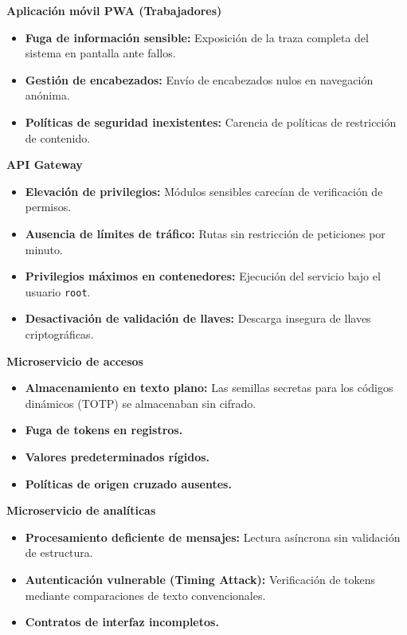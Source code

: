 \noindent \textbf{Aplicación móvil PWA (Trabajadores)}
\begin{itemize}
    \item \textbf{Fuga de información sensible:} Exposición de la traza completa del sistema en pantalla ante fallos.
    \item \textbf{Gestión de encabezados:} Envío de encabezados nulos en navegación anónima.
    \item \textbf{Políticas de seguridad inexistentes:} Carencia de políticas de restricción de contenido.
\end{itemize}

\noindent \textbf{API Gateway}
\begin{itemize}
    \item \textbf{Elevación de privilegios:} Módulos sensibles carecían de verificación de permisos.
    \item \textbf{Ausencia de límites de tráfico:} Rutas sin restricción de peticiones por minuto.
    \item \textbf{Privilegios máximos en contenedores:} Ejecución del servicio bajo el usuario \texttt{root}.
    \item \textbf{Desactivación de validación de llaves:} Descarga insegura de llaves criptográficas.
\end{itemize}

\noindent \textbf{Microservicio de accesos}
\begin{itemize}
    \item \textbf{Almacenamiento en texto plano:} Las semillas secretas para los códigos dinámicos (TOTP) se almacenaban sin cifrado.
    \item \textbf{Fuga de tokens en registros.}
    \item \textbf{Valores predeterminados rígidos.}
    \item \textbf{Políticas de origen cruzado ausentes.}
\end{itemize}

\noindent \textbf{Microservicio de analíticas}
\begin{itemize}
    \item \textbf{Procesamiento deficiente de mensajes:} Lectura asíncrona sin validación de estructura.
    \item \textbf{Autenticación vulnerable (Timing Attack):} Verificación de tokens mediante comparaciones de texto convencionales.
    \item \textbf{Contratos de interfaz incompletos.}
\end{itemize}

